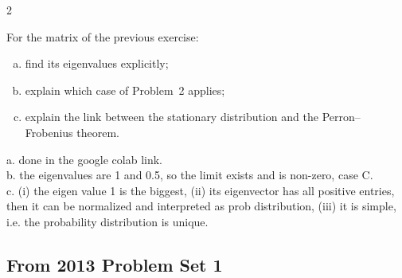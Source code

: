 \begin{paracol}{2}
\begin{exercise}[PS1 (2024), Problem 4]
For the matrix of the previous exercise:
\begin{enumerate}[(a)]
  \item find its eigenvalues explicitly;
  \item explain which case of
      Problem~2 applies;
  \item explain the link between the stationary distribution and the Perron--Frobenius
      theorem.
\end{enumerate}
\end{exercise}
\begin{mysolution}
  a. done in the google colab link. \\
  b. the eigenvalues are 1 and 0.5, so the limit exists and is non-zero, case C. \\
  c. (i) the eigen value 1 is the biggest, (ii) its eigenvector has all positive entries, then it can be normalized and interpreted as prob distribution, (iii) it is simple, i.e. the probability distribution is unique.
\end{mysolution}

\subsection*{From 2013 Problem Set 1}


\end{paracol}

